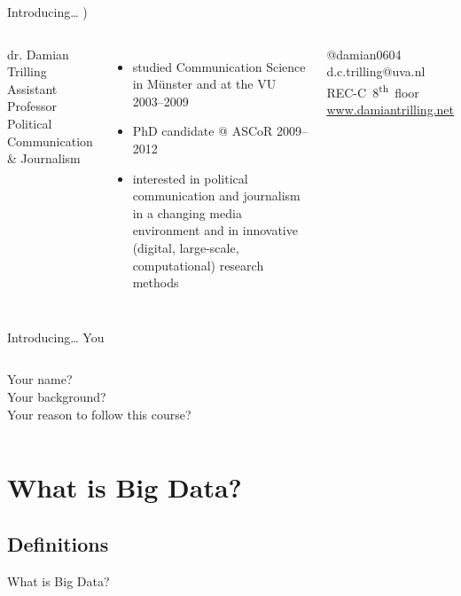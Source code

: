 \documentclass{beamer}
\begin{document}
\begin{frame}{Introducing\ldots}
{\huge{\right) }}
\small{}
\begin{columns}
	dr. Damian Trilling \\
	Assistant Professor Political Communication \& Journalism \\
	\begin{itemize}
		\item studied Communication Science in M\"unster and at the VU 2003--2009
		\item PhD candidate @ ASCoR 2009--2012
		\item interested in political communication and journalism in a changing media environment and in innovative (digital, large-scale, computational) research methods
	\end{itemize}
	@damian0604 ~~ d.c.trilling@uva.nl ~~ REC-C~8\textsuperscript{th}~floor ~~ \url{www.damiantrilling.net} 
\end{columns}
\end{frame}


\begin{frame}{Introducing\ldots}
	{\huge{You}}
	\small{}
	\begin{columns}
		Your name?\\
		Your background?\\
		Your reason to follow this course?
	\end{columns}
\end{frame}


\section{What is Big Data?}
\subsection{Definitions}

\begin{frame}
What is Big Data?
\end{frame}


{
\begin{frame}[plain]
\end{frame}
}
\end{document}
